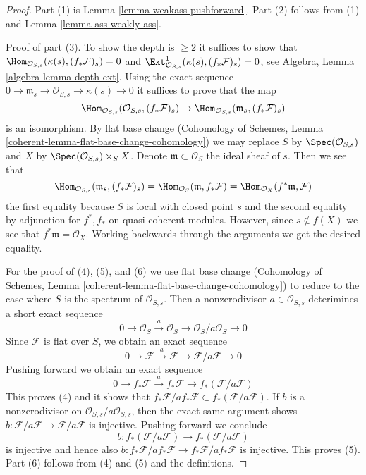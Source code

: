 \begin{proof}
Part (1) is Lemma \ref{lemma-weakass-pushforward}.
Part (2) follows from (1) and Lemma \ref{lemma-ass-weakly-ass}.

\medskip\noindent
Proof of part (3). To show the depth is $\geq 2$ it suffices to show that
$\Hom_{\mathcal{O}_{S, s}}(\kappa(s), (f_*\mathcal{F})_s) = 0$ and
$\Ext^1_{\mathcal{O}_{S, s}}(\kappa(s), (f_*\mathcal{F})_s) = 0$, see
Algebra, Lemma \ref{algebra-lemma-depth-ext}.
Using the exact sequence
$0 \to \mathfrak m_s \to \mathcal{O}_{S, s} \to \kappa(s) \to 0$
it suffices to prove that the map
$$
\Hom_{\mathcal{O}_{S, s}}(\mathcal{O}_{S, s}, (f_*\mathcal{F})_s)
\to
\Hom_{\mathcal{O}_{S, s}}(\mathfrak m_s, (f_*\mathcal{F})_s)
$$
is an isomorphism. By flat base change (Cohomology of Schemes, Lemma
\ref{coherent-lemma-flat-base-change-cohomology})
we may replace $S$ by
$\Spec(\mathcal{O}_{S, s})$ and $X$ by $\Spec(\mathcal{O}_{S, s}) \times_S X$.
Denote $\mathfrak m \subset \mathcal{O}_S$ the ideal sheaf of $s$.
Then we see that
$$
\Hom_{\mathcal{O}_{S, s}}(\mathfrak m_s, (f_*\mathcal{F})_s) =
\Hom_{\mathcal{O}_S}(\mathfrak m, f_*\mathcal{F}) =
\Hom_{\mathcal{O}_X}(f^*\mathfrak m, \mathcal{F})
$$
the first equality because $S$ is local with closed point $s$
and the second equality
by adjunction for $f^*, f_*$ on quasi-coherent modules. However, since
$s \not \in f(X)$ we see that $f^*\mathfrak m = \mathcal{O}_X$.
Working backwards through the arguments we get the desired equality.

\medskip\noindent
For the proof of (4), (5), and (6) we use flat base change
(Cohomology of Schemes, Lemma
\ref{coherent-lemma-flat-base-change-cohomology})
to reduce to the case where $S$ is the spectrum of
$\mathcal{O}_{S, s}$.
Then a nonzerodivisor $a \in \mathcal{O}_{S, s}$
deterimines a short exact sequence
$$
0 \to \mathcal{O}_S \xrightarrow{a} \mathcal{O}_S \to
\mathcal{O}_S/a \mathcal{O}_S \to 0
$$
Since $\mathcal{F}$ is flat over $S$, we obtain an exact sequence
$$
0 \to \mathcal{F} \xrightarrow{a} \mathcal{F} \to
\mathcal{F}/a\mathcal{F} \to 0
$$
Pushing forward we obtain an exact sequence
$$
0 \to f_*\mathcal{F} \xrightarrow{a} f_*\mathcal{F} \to
f_*(\mathcal{F}/a\mathcal{F})
$$
This proves (4) and it shows that
$f_*\mathcal{F}/ af_*\mathcal{F} \subset f_*(\mathcal{F}/a\mathcal{F})$.
If $b$ is a nonzerodivisor on
$\mathcal{O}_{S, s}/a\mathcal{O}_{S, s}$, then the exact same argument shows
$b : \mathcal{F}/a\mathcal{F} \to \mathcal{F}/a\mathcal{F}$
is injective. Pushing forward we conclude
$$
b : f_*(\mathcal{F}/a\mathcal{F}) \to f_*(\mathcal{F}/a\mathcal{F})
$$
is injective and hence also
$b : f_*\mathcal{F}/ af_*\mathcal{F} \to f_*\mathcal{F}/ af_*\mathcal{F}$
is injective. This proves (5). Part (6) follows from
(4) and (5) and the definitions.
\end{proof}











